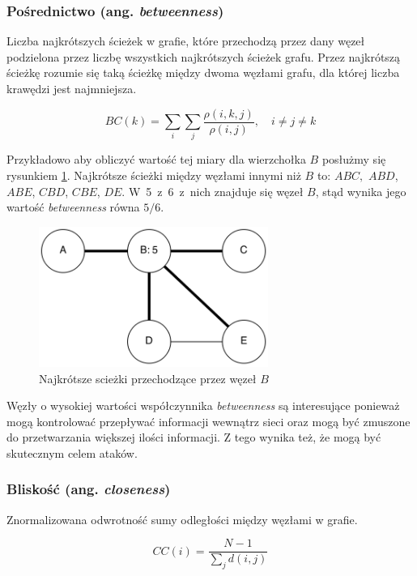   
\clearpage
\subsubsection{Pośrednictwo (ang. \textit{betweenness}) }  
Liczba najkrótszych ścieżek w grafie, które przechodzą przez dany węzeł podzielona
przez liczbę wszystkich najkrótszych ścieżek grafu. Przez najkrótszą ścieżkę 
rozumie się taką ścieżkę między dwoma węzłami grafu, dla której liczba krawędzi
jest najmniejsza.
  
\begin{equation}
BC(k) = \sum\limits_{i}\sum\limits_{j}\frac{\rho(i, k, j)}{\rho(i, j)}, \quad i \neq j \neq k
\end{equation}  

Przykładowo aby obliczyć wartość tej miary dla wierzchołka $B$ posłużmy się rysunkiem 
\ref{image:betweenness}.
Najkrótsze ścieżki między węzłami innymi niż $B$ to: $ABC,$ $ABD$, $ABE$, $CBD$, $CBE$, $DE$.
\mbox{W 5 z 6 z nich} znajduje się węzeł $B$, stąd wynika jego wartość \textit{betweenness}
równa $5/6$. 

\begin{figure}[ht!]
\centering
\includegraphics[width=75mm]{img/betweenness.png}
\caption{Najkrótsze scieżki przechodzące przez węzeł $B$}
\label{image:betweenness}
\end{figure}

Węzły o wysokiej wartości współczynnika \textit{betweenness} są interesujące
ponieważ mogą kontrolować przepływać informacji wewnątrz sieci oraz
mogą być zmuszone do przetwarzania większej ilości informacji.
Z tego wynika też, że mogą być skutecznym celem ataków.
    
  
\clearpage  
\subsubsection{Bliskość (ang. \textit{closeness})}  
Znormalizowana odwrotność sumy odległości między węzłami w grafie.
  
\begin{equation}
CC(i) = \frac{N - 1}{\sum\limits_{j}d(i, j)}
\end{equation}  

